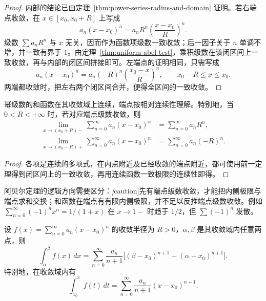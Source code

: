 \begin{proof}
内部的结论已由定理~\ref{thm:power-series-radius-and-domain} 证明。若右端点收敛，在 $x\in[x_0,x_0+R]$ 上写成
\[
    a_n(x-x_0)^n=a_nR^n
        \left(\frac{x-x_0}{R}\right)^n.
\]
级数 $\sum a_nR^n$ 与 $x$ 无关，因而作为函数项级数一致收敛；后一因子关于 $n$ 单调不增，并一致有界于 $1$。由定理~\ref{thm:uniform-abel-test}，乘积级数在该闭区间上一致收敛，再与内部的闭区间拼接即可。左端点的证明相同，只需写成
\[
    a_n(x-x_0)^n=a_n(-R)^n
        \left(\frac{x_0-x}{R}\right)^n,
    \qquad x_0-R\leq x\leq x_0.
\]
两端都收敛时，把左右两个闭区间合并，便得全区间的一致收敛。
\end{proof}

\begin{corollary}[和函数的连续性与端点极限]
\label{cor:power-series-continuity-and-abel-limits}
幂级数的和函数在其收敛域上连续，端点按相对连续性理解。特别地，当 $0<R<+\infty$ 时，若对应端点级数收敛，则
\begin{align}
    \lim_{x\to(x_0+R)-}\sum_{n=0}^\infty a_n(x-x_0)^n
        &=\sum_{n=0}^\infty a_nR^n,
        \label{eq:abel-right-endpoint-limit}\\
    \lim_{x\to(x_0-R)+}\sum_{n=0}^\infty a_n(x-x_0)^n
        &=\sum_{n=0}^\infty a_n(-R)^n.
        \label{eq:abel-left-endpoint-limit}
\end{align}
\end{corollary}

\begin{proof}
各项是连续的多项式，在内点附近及已经收敛的端点附近，都可使用前一定理得到闭区间上的一致收敛，再用连续函数一致极限的连续性即得。
\end{proof}

阿贝尔定理的逻辑方向需要区分：\emph[caution]{先有端点级数收敛，才能把内侧极限与端点求和交换；和函数在端点有有限内侧极限，并不足以反推端点级数收敛。}例如 $\sum_{n=0}^\infty(-1)^nx^n=1/(1+x)$ 在 $x\to1-$ 时趋于 $1/2$，但 $\sum(-1)^n$ 发散。

\begin{theorem}[逐项积分]
\label{thm:power-series-termwise-integration}
设 $f(x)=\sum_{n=0}^\infty a_n(x-x_0)^n$ 的收敛半径为 $R>0$，$\alpha,\beta$ 是其收敛域内任意两点，则
\begin{equation}
    \int_\alpha^\beta f(x)\,dx
    =\sum_{n=0}^\infty
       \frac{a_n}{n+1}
       \bigl[(\beta-x_0)^{n+1}-(\alpha-x_0)^{n+1}\bigr].
    \label{eq:power-series-integral-between-convergence-points}
\end{equation}
特别地，在收敛域内有
\begin{equation}
    \int_{x_0}^x f(t)\,dt
       =\sum_{n=0}^\infty\frac{a_n}{n+1}(x-x_0)^{n+1}.
    \label{eq:power-series-integral-from-center}
\end{equation}
\end{theorem}

